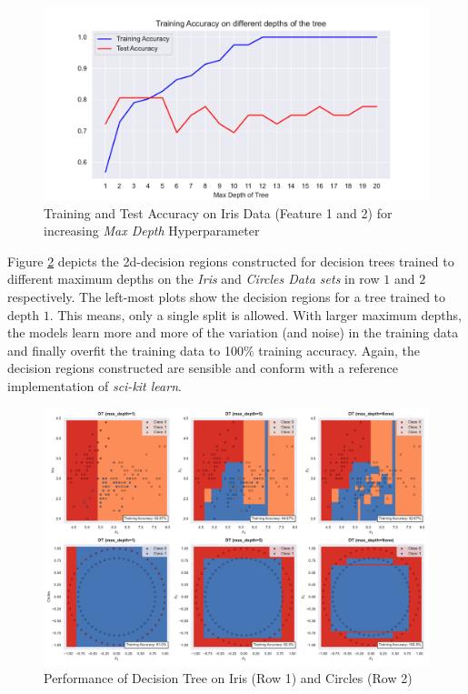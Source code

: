 \begin{figure}[ht]
\centering
\includegraphics[scale=0.6]{figures/assert_dt_overfit.pdf}
\captionsetup{justification=centering,margin=2cm}
\caption{Training and Test Accuracy on Iris Data (Feature 1 and 2) for increasing \textit{Max Depth} Hyperparameter}
\label{assert_dt_overfit}
\end{figure}

Figure \ref{assert_dt_toydata} depicts the 2d-decision regions constructed for decision trees trained to different maximum depths on the \textit{Iris} and \textit{Circles Data sets} in row $1$ and $2$ respectively. The left-most plots show the decision regions for a tree trained to depth $1$. This means, only a single split is allowed. With larger maximum depths, the models learn more and more of the variation (and noise) in the training data and finally overfit the training data to 100\% training accuracy. Again, the decision regions constructed are sensible and conform with a reference implementation of \textit{sci-kit learn}.
\newline

\begin{figure}[ht!]
\centering
\includegraphics[scale=0.35]{figures/assert_dt_toydata.pdf}
\captionsetup{justification=centering,margin=2cm}
\caption{Performance of Decision Tree on Iris (Row 1) and Circles (Row 2)}
\label{assert_dt_toydata}
\end{figure}
\newpage


